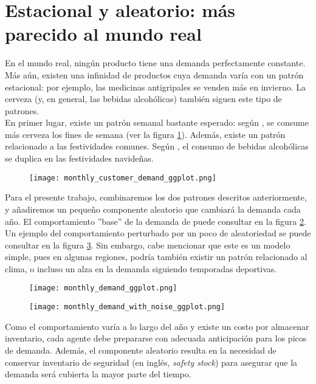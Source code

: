 \section{Estacional y aleatorio: m\'as parecido al mundo real}

En el mundo real, ning\'un producto tiene una demanda perfectamente constante. M\'as a\'un, existen una infinidad de productos cuya demanda var\'ia con un patr\'on estacional: por ejemplo, las medicinas antigripales se venden m\'as en invierno. La cerveza (y, en general, las bebidas alcoh\'olicas) tambi\'en siguen este tipo de patrones.\\

En primer lugar, existe un patr\'on semanal bastante esperado: seg\'un \citet{}, se consume m\'as cerveza los fines de semana (ver la figura \ref{weekly_base}). Adem\'as, existe un patr\'on relacionado a las festividades comunes. Seg\'un \citet{}, el consumo de bebidas alcoh\'olicas se duplica en las festividades navide\~nas. \\

\begin{figure}[h!]
\caption{ }
\label{weekly_base}
\texttt{[image: monthly\_customer\_demand\_ggplot.png]}
\centering
\end{figure}

Para el presente trabajo, combinaremos los dos patrones descritos anteriormente, y a\~nadiremos un peque\~no componente aleatorio que cambiar\'a la demanda cada a\~no. El comportamiento ''base'' de la demanda de puede consultar en la figura \ref{yearly_base}. Un ejemplo del comportamiento perturbado por un poco de aleatoriedad se puede consultar en la figura \ref{yearly_base_noisy}. Sin embargo, cabe mencionar que este es un modelo simple, pues en algunas regiones, podr\'ia tambi\'en existir un patr\'on relacionado al clima, o incluso un alza en la demanda siguiendo temporadas deportivas. \\

\begin{figure}[h!]
\caption{ }
\label{yearly_base}
\texttt{[image: monthly\_demand\_ggplot.png]}
\centering
\end{figure}

\begin{figure}[h!]
\caption{ }
\label{yearly_base_noisy}
\texttt{[image: monthly\_demand\_with\_noise\_ggplot.png]}
\centering
\end{figure}

Como el comportamiento var\'ia a lo largo del a\~no y existe un costo por almacenar inventario, cada agente debe prepararse con adecuada anticipaci\'on para los picos de demanda. Adem\'as, el componente aleatorio resulta en la necesidad de conservar inventario de seguridad (en ingl\'es, \textit{safety stock}) para asegurar que la demanda ser\'a cubierta la mayor parte del tiempo.

